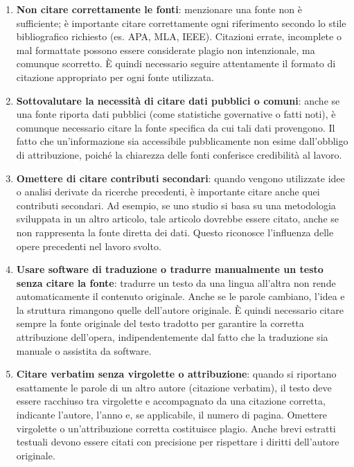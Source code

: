 \documentclass[9pt,a4paper,twoside]{rho-class/rho}
\begin{document}
\begin{enumerate}
\item \textbf{Non citare correttamente le fonti}: menzionare una fonte non è sufficiente; è importante citare correttamente ogni riferimento secondo lo stile bibliografico richiesto (es. APA, MLA, IEEE). Citazioni errate, incomplete o mal formattate possono essere considerate plagio non intenzionale, ma comunque scorretto. È quindi necessario seguire attentamente il formato di citazione appropriato per ogni fonte utilizzata.

\item \textbf{Sottovalutare la necessità di citare dati pubblici o comuni}: anche se una fonte riporta dati pubblici (come statistiche governative o fatti noti), è comunque necessario citare la fonte specifica da cui tali dati provengono. Il fatto che un’informazione sia accessibile pubblicamente non esime dall’obbligo di attribuzione, poiché la chiarezza delle fonti conferisce credibilità al lavoro.

\item \textbf{Omettere di citare contributi secondari}: quando vengono utilizzate idee o analisi derivate da ricerche precedenti, è importante citare anche quei contributi secondari. Ad esempio, se uno studio si basa su una metodologia sviluppata in un altro articolo, tale articolo dovrebbe essere citato, anche se non rappresenta la fonte diretta dei dati. Questo riconosce l’influenza delle opere precedenti nel lavoro svolto.

\item \textbf{Usare software di traduzione o tradurre manualmente un testo senza citare la fonte}: tradurre un testo da una lingua all’altra non rende automaticamente il contenuto originale. Anche se le parole cambiano, l’idea e la struttura rimangono quelle dell’autore originale. È quindi necessario citare sempre la fonte originale del testo tradotto per garantire la corretta attribuzione dell’opera, indipendentemente dal fatto che la traduzione sia manuale o assistita da software.

\item \textbf{Citare verbatim senza virgolette o attribuzione}: quando si riportano esattamente le parole di un altro autore (citazione verbatim), il testo deve essere racchiuso tra virgolette e accompagnato da una citazione corretta, indicante l’autore, l’anno e, se applicabile, il numero di pagina. Omettere virgolette o un’attribuzione corretta costituisce plagio. Anche brevi estratti testuali devono essere citati con precisione per rispettare i diritti dell’autore originale.

\end{enumerate}
\end{document}
